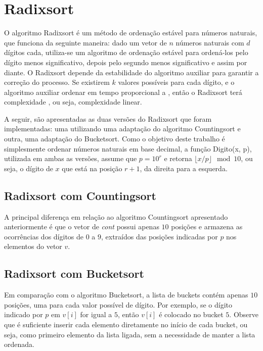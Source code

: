 \section{Radixsort}
O algoritmo Radixsort é um método de ordenação estável para números naturais, que funciona da seguinte maneira: dado um vetor de $n$ números naturais com $d$ dígitos cada, utiliza-se um algoritmo de ordenação estável para ordená-los pelo dígito menos significativo, depois pelo segundo menos significativo e assim por diante. O Radixsort depende da estabilidade do algoritmo auxiliar para garantir a correção do processo. Se existirem $k$ valores possíveis para cada dígito, e o algoritmo auxiliar ordenar em tempo proporcional a , então o Radixsort terá complexidade , ou seja, complexidade linear.

A seguir, são apresentadas as duas versões do Radixsort que foram implementadas: uma utilizando uma adaptação do algoritmo Countingsort e outra, uma adaptação do Bucketsort. Como o objetivo deste trabalho é simplesmente ordenar números naturais em base decimal, a função Digito(x, p), utilizada em ambas as versões, assume que $p = 10^r$ e retorna $\lfloor x / p \rfloor \mod 10$, ou seja, o dígito de $x$ que está na posição $r + 1$, da direita para a esquerda.

\subsection*{Radixsort com Countingsort}
A principal diferença em relação ao algoritmo Countingsort apresentado anteriormente é que o vetor de \textit{cont} possui apenas $10$ posições e armazena as ocorrências dos dígitos de $0$ a $9$, extraídos das posições indicadas por $p$ nos elementos do vetor $v$.


\subsection*{Radixsort com Bucketsort}
Em comparação com o algoritmo Bucketsort, a lista de buckets contém apenas $10$ posições, uma para cada valor possível de dígito. Por exemplo, se o dígito indicado por $p$ em $v[i]$ for igual a $5$, então $v[i]$ é colocado no bucket $5$. Observe que é suficiente inserir cada elemento diretamente no início de cada bucket, ou seja, como primeiro elemento da lista ligada, sem a necessidade de manter a lista ordenada.

